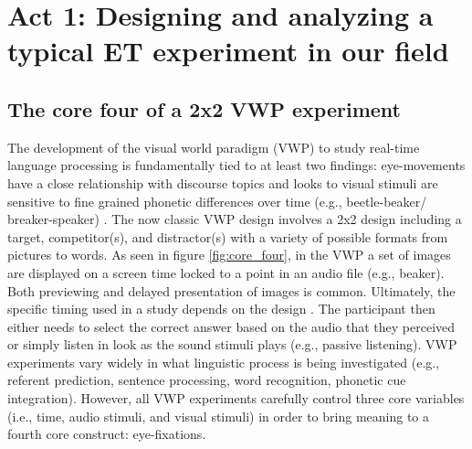 \section{Act 1: Designing and analyzing a typical ET experiment in our field }
\subsection{The core four of a 2x2 VWP experiment}
The development of the visual world paradigm (VWP) to study real-time language processing is fundamentally tied to at least two findings: eye-movements have a close relationship with discourse topics \parencite{Cooper} and looks to visual stimuli are sensitive to fine grained phonetic differences over time (e.g., beetle-beaker/ breaker-speaker) \parencite[e.g.][]{Tanenhaus_Spivey-Knowlton_Eberhard_Sedivy_1995,Allopenna_1998}. The now classic VWP design involves a 2x2 design including a target, competitor(s), and distractor(s) with a variety of possible formats from pictures to words. As seen in figure \ref{fig:core_four}, in the VWP a set of images are displayed on a screen time locked to a point in an audio file (e.g., beaker). Both previewing and delayed presentation of images is common. Ultimately, the specific timing used in a study depends on the design  \parencite[see,][, for a review]{Apfelbaum_Klein-Packard_McMurray_2021}{}{}.  The participant then either needs to select the correct answer based on the audio that they perceived or simply listen in look as the sound stimuli plays (e.g., passive listening). VWP experiments vary widely in what linguistic process is being investigated (e.g., referent prediction, sentence processing, word recognition, phonetic cue integration). However, all VWP experiments carefully control three core variables (i.e., time, audio stimuli, and visual stimuli) in order to bring meaning to a fourth core construct: eye-fixations. 

